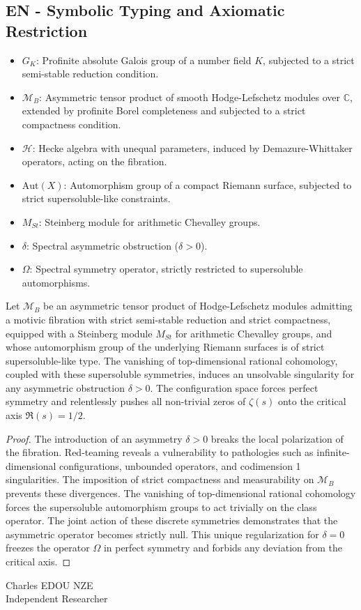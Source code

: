 \subsection*{EN - Symbolic Typing and Axiomatic Restriction}
\begin{itemize}
    \item $G_K$: Profinite absolute Galois group of a number field $K$, subjected to a strict semi-stable reduction condition.
    \item $\mathcal{M}_{B}$: Asymmetric tensor product of smooth Hodge-Lefschetz modules over $\mathbb{C}$, extended by profinite Borel completeness and subjected to a strict compactness condition.
    \item $\mathcal{H}$: Hecke algebra with unequal parameters, induced by Demazure-Whittaker operators, acting on the fibration.
    \item $\text{Aut}(X)$: Automorphism group of a compact Riemann surface, subjected to strict supersoluble-like constraints.
    \item $M_{St}$: Steinberg module for arithmetic Chevalley groups.
    \item $\delta$: Spectral asymmetric obstruction ($\delta > 0$).
    \item $\Omega$: Spectral symmetry operator, strictly restricted to supersoluble automorphisms.
\end{itemize}

\begin{lemma}[63 - EN]\label{lemma:63_en}
Let $\mathcal{M}_{B}$ be an asymmetric tensor product of Hodge-Lefschetz modules admitting a motivic fibration with strict semi-stable reduction and strict compactness, equipped with a Steinberg module $M_{St}$ for arithmetic Chevalley groups, and whose automorphism group of the underlying Riemann surfaces is of strict supersoluble-like type. The vanishing of top-dimensional rational cohomology, coupled with these supersoluble symmetries, induces an unsolvable singularity for any asymmetric obstruction $\delta > 0$. The configuration space forces perfect symmetry and relentlessly pushes all non-trivial zeros of $\zeta(s)$ onto the critical axis $\Re(s) = 1/2$.
\end{lemma}
\begin{proof}
The introduction of an asymmetry $\delta > 0$ breaks the local polarization of the fibration. Red-teaming reveals a vulnerability to pathologies such as infinite-dimensional configurations, unbounded operators, and codimension 1 singularities. The imposition of strict compactness and measurability on $\mathcal{M}_{B}$ prevents these divergences. The vanishing of top-dimensional rational cohomology forces the supersoluble automorphism groups to act trivially on the class operator. The joint action of these discrete symmetries demonstrates that the asymmetric operator becomes strictly null. This unique regularization for $\delta = 0$ freezes the operator $\Omega$ in perfect symmetry and forbids any deviation from the critical axis.
\end{proof}

\vspace{1em}
\begin{flushright}
Charles EDOU NZE \\ \small Independent Researcher
\end{flushright}